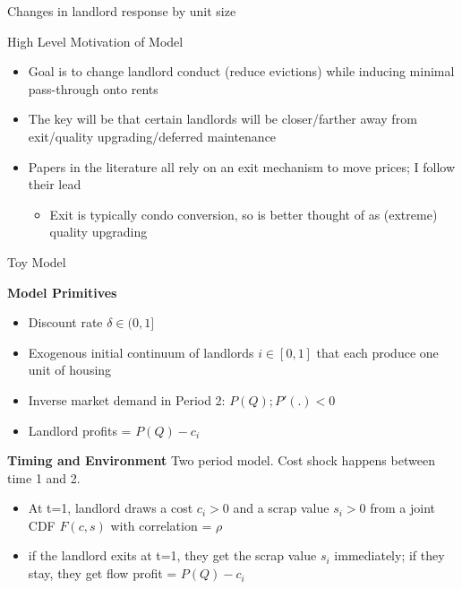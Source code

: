 \documentclass[10pt, xcolor=dvipsnames]{beamer}
\begin{document}
\begin{frame}{Changes in landlord response by unit size}
    
\end{frame}

\begin{frame}{High Level Motivation of Model}
\begin{itemize}
    \item Goal is to change landlord conduct (reduce evictions) while inducing minimal pass-through onto rents
    \item The key will be that certain landlords will be closer/farther away from exit/quality upgrading/deferred maintenance 
    \item Papers in the literature \cite{diamond-2019, collinson2024eviction, } all rely on an exit mechanism to move prices; I follow their lead
    \begin{itemize}
        \item Exit is typically condo conversion, so is better thought of as (extreme) quality upgrading
    \end{itemize}
\end{itemize}
    
\end{frame}




\begin{frame}{Toy Model}

\textbf{Model Primitives}
\begin{itemize}
    \item Discount rate $\delta \in (0,1]$
    \item Exogenous initial continuum of landlords $i \in [0,1]$ that each produce one unit of housing
    \item Inverse market demand in Period 2: $P(Q); P'(.) < 0$
    \item Landlord profits = $P(Q) - c_i$
\end{itemize}

\textbf{Timing and Environment}
Two period model. Cost shock happens between time 1 and 2.
\begin{itemize}
    \item At t=1, landlord draws a cost $c_i>0$ and a scrap value $s_i>0$ from a joint CDF $F(c,s)$ with correlation = $\rho$
    \item if the landlord exits at t=1, they get the scrap value $s_i$ immediately; if they stay, they get flow profit = $P(Q) - c_i$
\end{itemize}


\end{frame}
\end{document}
